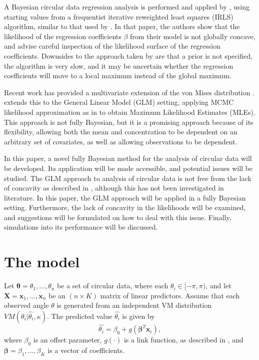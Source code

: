 \documentclass[12pt,a4paper]{article}\usepackage[]{graphicx}\usepackage[]{color}
\begin{document}
A Bayesian circular data regression analysis is performed and applied by \citet{gill2010}, using starting values from a frequentist iterative reweighted least squares (IRLS) algorithm, similar to that used by \citet{fisher1992regression}. In that paper, the authors show that the likelihood of the regression coefficients $\beta$ from their model is not globally concave, and advise careful inspection of the likelihood surface of the regression coefficients. Downsides to the approach taken by \citet{gill2010} are that a prior is not specified, the algorithm is very slow, and it may be uncertain whether the regression coefficients will move to a local maximum instead of the global maximum.

Recent work has provided a multivariate extension of the von Mises distribution \citep{mardia2008multivariate,mardia2014some}. \citet{lagona2014regression} extends this to the General Linear Model (GLM) setting, applying MCMC likelihood approximation as in \citet{geyer1992constrained} to obtain Maximum Likelihood Estimates (MLEs). This approach is not fully Bayesian, but it is a promising approach because of its flexibility, allowing both the mean and concentration to be dependent on an arbitrary set of covariates, as well as allowing observations to be dependent.

In this paper, a novel fully Bayesian method for the analysis of circular data will be developed. Its application will be made accessible, and potential issues will be studied. The GLM approach to analysis of circular data is not free from the lack of concavity as described in \citet{gill2010}, although this has not been investigated in literature. In this paper, the GLM approach will be applied in a fully Bayesian setting. Furthermore, the lack of concavity in the likelihoods will be examined, and suggestions will be formulated on how to deal with this issue. Finally, simulations into its performance will be discussed.

\section{The model}

Let $\boldsymbol\theta = \theta_1, \dots, \theta_n$ be a set of circular data, where each $\theta_i \in [-\pi, \pi)$, and let $\boldsymbol{X} = \boldsymbol{x}_1, \dots, \boldsymbol{x}_n$ be an $(n \times K)$ matrix of linear predictors. Assume that each observed angle $\theta$ is generated from an independent VM distribution $ VM(\theta_i \vert \hat{\theta_i}, \kappa)$. The predicted value $\hat{\theta_i}$ is given by
\begin{equation}
\hat{\theta_i} = \beta_0 + g(\boldsymbol\beta^T \boldsymbol{x}_i),
\end{equation}
where $\beta_0$ is an offset parameter, $g(\cdot)$ is a link function, as described in \citet{fisher1992regression}, and $\boldsymbol{\beta} = \beta_1, \dots, \beta_K$ is a vector of coefficients.
\end{document}

